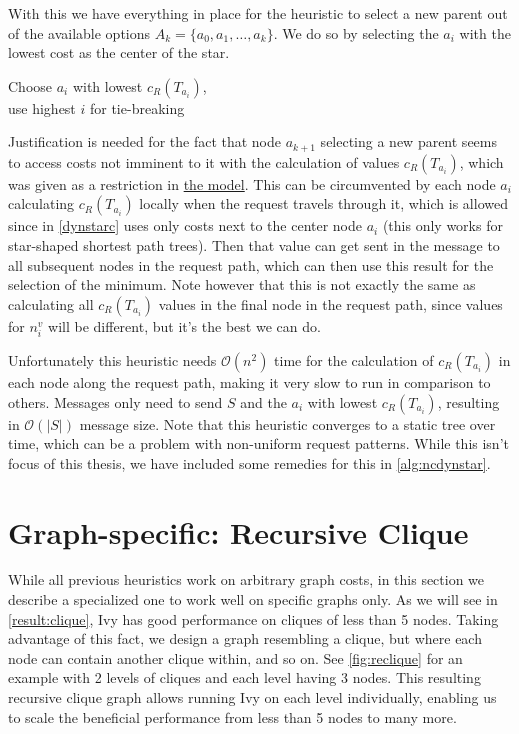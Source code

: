\documentclass[a4paper, oneside]{discothesis}
\begin{document}
With this we have everything in place for the heuristic to select a new parent out of the available options $A_k=\{a_{0},a_{1},\dots,a_k\}$. We do so by selecting the $a_{i}$ with the lowest cost as the center of the star.

\begin{algorithmic}
\State\Return Choose $a_{i}$ with lowest $c_R(T_{a_{i}})$, \\\qquad use highest $i$ for tie-breaking
\EndFunction
\end{algorithmic}

Justification is needed for the fact that node $a_{k+1}$ selecting a new parent seems to access costs not imminent to it with the calculation of values $c_R(T_{a_{i}})$, which was given as a restriction in \hyperref[model]{the model}. This can be circumvented by each node $a_{i}$ calculating $c_R(T_{a_{i}})$ locally when the request travels through it, which is allowed since in \autoref{dynstarc} uses only costs next to the center node $a_{i}$ (this only works for star-shaped shortest path trees). Then that value can get sent in the message to all subsequent nodes in the request path, which can then use this result for the selection of the minimum. Note however that this is not exactly the same as calculating all $c_R(T_{a_{i}})$ values in the final node in the request path, since values for $n_i^v$ will be different, but it's the best we can do.

Unfortunately this heuristic needs $\mathcal{O}(n^2)$ time for the calculation of $c_R(T_{a_i})$ in each node along the request path, making it very slow to run in comparison to others. Messages only need to send $S$ and the $a_{i}$ with lowest $c_R(T_{a_{i}})$, resulting in $\mathcal{O}(|S|)$ message size. Note that this heuristic converges to a static tree over time, which can be a problem with non-uniform request patterns. While this isn't focus of this thesis, we have included some remedies for this in \autoref{alg:ncdynstar}.

\section{Graph-specific: Recursive Clique}
\label{alg:reclique}

While all previous heuristics work on arbitrary graph costs, in this section we describe a specialized one to work well on specific graphs only. As we will see in \autoref{result:clique}, Ivy has good performance on cliques of less than 5 nodes. Taking advantage of this fact, we design a graph resembling a clique, but where each node can contain another clique within, and so on. See \autoref{fig:reclique} for an example with 2 levels of cliques and each level having 3 nodes. This resulting recursive clique graph allows running Ivy on each level individually, enabling us to scale the beneficial performance from less than 5 nodes to many more.
\end{document}

